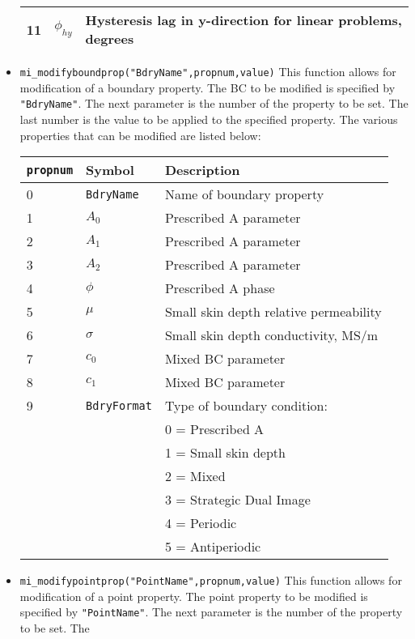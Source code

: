 \begin{itemize}
\begin{center}
\begin{tabular}{lll}
 11 & $\phi_{hy}$ & Hysteresis lag in y-direction for linear problems, degrees \\
 \hline
 \end{tabular}
 \end{center}
\item{\verb+mi_modifyboundprop("BdryName",propnum,value)+}
This function allows for modification of a boundary property. The
BC to be modified is specified by {\tt "BdryName"}.  The next
parameter is the number of the property to be set. The last number
is the value to be applied to the specified property.  The various
properties that can be modified are listed below:
\begin{center}
\begin{tabular}{lll} \hline
{\tt propnum}& Symbol & Description \\ \hline
 0 & {\tt BdryName} & Name of boundary property \\
 1 & $A_0$ & Prescribed A parameter \\
 2 & $A_1$ & Prescribed A parameter \\
 3 & $A_2$ & Prescribed A parameter \\
 4 & $\phi$ & Prescribed A phase \\
 5 & $\mu$ & Small skin depth relative permeability \\
 6 & $\sigma$ & Small skin depth conductivity, MS/m \\
 7 & $c_0$ & Mixed BC parameter \\
 8 & $c_1$ & Mixed BC parameter \\
 9 & {\tt BdryFormat} & Type of boundary condition: \\
   &                 & 0 = Prescribed A \\
   &                 & 1 = Small skin depth \\
   &                 & 2 = Mixed \\
   &                 & 3 = Strategic Dual Image \\
   &                 & 4 = Periodic \\
   &                 & 5 = Antiperiodic \\ \hline
\end{tabular}
\end{center}
\item{\verb+mi_modifypointprop("PointName",propnum,value)+}
This function allows for modification of a point property. The
point property to be modified is specified by {\tt "PointName"}.
The next parameter is the number of the property to be set. The

\end{itemize}

